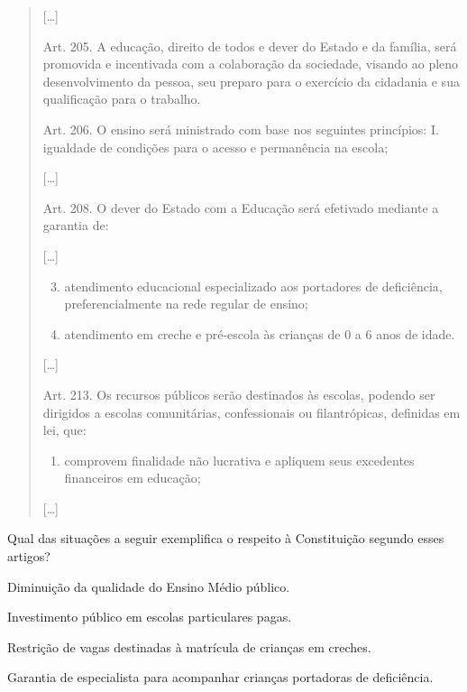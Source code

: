 \begin{quote}
{[}\ldots{}{]}

Art. 205. A educação, direito de todos e dever do Estado e da família,
será promovida e incentivada com a colaboração da sociedade, visando ao
pleno desenvolvimento da pessoa, seu preparo para o exercício da
cidadania e sua qualificação para o trabalho.

Art. 206. O ensino será ministrado com base nos seguintes princípios: I.
igualdade de condições para o acesso e permanência na escola;

{[}\ldots{}{]}

Art. 208. O dever do Estado com a Educação será efetivado mediante a
garantia de:

{[}\ldots{}{]}

\begin{enumerate}
\setcounter{enumi}{2}
\item
  atendimento educacional especializado aos portadores de deficiência,
  preferencialmente na rede regular de ensino;

\item atendimento em creche e pré-escola às crianças de 0 a 6 anos de idade.
\end{enumerate}

{[}\ldots{}{]}

Art. 213. Os recursos públicos serão destinados às escolas, podendo ser
dirigidos a escolas comunitárias, confessionais ou filantrópicas,
definidas em lei, que:

\begin{enumerate}
\item comprovem finalidade não lucrativa e apliquem seus excedentes
financeiros em educação;
\end{enumerate}

{[}\ldots{}{]}
\end{quote}

Qual das situações a seguir exemplifica o respeito à Constituição
segundo esses artigos?

\begin{escolha}
\item
  Diminuição da qualidade do Ensino Médio público.
\item
  Investimento público em escolas particulares pagas.
\item
  Restrição de vagas destinadas à matrícula de crianças em creches.
\item
  Garantia de especialista para acompanhar crianças portadoras de
  deficiência.
\end{escolha}

